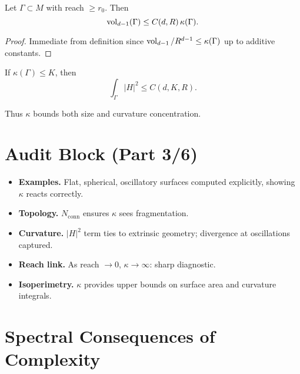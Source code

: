 \begin{proposition}
Let $\Gamma\subset M$ with reach $\ge r_0$. Then
\[
\operatorname{vol}_{d-1}(\Gamma)\le C(d,R)\,\kappa(\Gamma).
\]
\end{proposition}

\begin{proof}
Immediate from definition since $\operatorname{vol}_{d-1}/R^{d-1}\le \kappa(\Gamma)$ up to additive constants.
\end{proof}

\begin{corollary}
If $\kappa(\Gamma)\le K$, then
\[
\int_\Gamma |H|^2 \le C(d,K,R).
\]
\end{corollary}

Thus $\kappa$ bounds both size and curvature concentration.

\section{Audit Block (Part 3/6)}
\label{sec:audit-part3}

\begin{itemize}
\item \textbf{Examples.} Flat, spherical, oscillatory surfaces computed explicitly, showing $\kappa$ reacts correctly.
\item \textbf{Topology.} $N_{\mathrm{conn}}$ ensures $\kappa$ sees fragmentation.
\item \textbf{Curvature.} $|H|^2$ term ties to extrinsic geometry; divergence at oscillations captured.
\item \textbf{Reach link.} As reach $\to 0$, $\kappa\to\infty$: sharp diagnostic.
\item \textbf{Isoperimetry.} $\kappa$ provides upper bounds on surface area and curvature integrals.
\end{itemize}

\bigskip


\section{Spectral Consequences of Complexity}
\label{sec:spectral-complexity}

